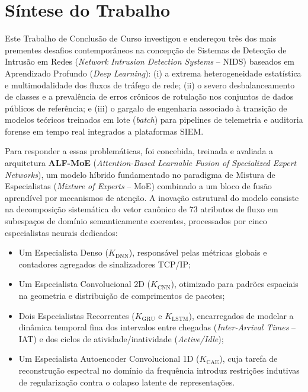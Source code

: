 \section{Síntese do Trabalho}
\label{sec:sintese_trabalho}

Este Trabalho de Conclusão de Curso investigou e endereçou três dos mais prementes desafios contemporâneos na concepção de Sistemas de Detecção de Intrusão em Redes (\emph{Network Intrusion Detection Systems} -- NIDS) baseados em Aprendizado Profundo (\emph{Deep Learning}): (i) a extrema heterogeneidade estatística e multimodalidade dos fluxos de tráfego de rede; (ii) o severo desbalanceamento de classes e a prevalência de erros crônicos de rotulação nos conjuntos de dados públicos de referência; e (iii) o gargalo de engenharia associado à transição de modelos teóricos treinados em lote (\emph{batch}) para pipelines de telemetria e auditoria forense em tempo real integrados a plataformas SIEM.

Para responder a essas problemáticas, foi concebida, treinada e avaliada a arquitetura \textbf{ALF-MoE} (\emph{Attention-Based Learnable Fusion of Specialized Expert Networks}), um modelo híbrido fundamentado no paradigma de Mistura de Especialistas (\emph{Mixture of Experts} -- MoE) combinado a um bloco de fusão aprendível por mecanismos de atenção. A inovação estrutural do modelo consiste na decomposição sistemática do vetor canônico de 73 atributos de fluxo em subespaços de domínio semanticamente coerentes, processados por cinco especialistas neurais dedicados:
\begin{itemize}
    \item Um Especialista Denso ($K_{\mathrm{DNN}}$), responsável pelas métricas globais e contadores agregados de sinalizadores TCP/IP;
    \item Um Especialista Convolucional 2D ($K_{\mathrm{CNN}}$), otimizado para padrões espaciais na geometria e distribuição de comprimentos de pacotes;
    \item Dois Especialistas Recorrentes ($K_{\mathrm{GRU}}$ e $K_{\mathrm{LSTM}}$), encarregados de modelar a dinâmica temporal fina dos intervalos entre chegadas (\emph{Inter-Arrival Times} -- IAT) e dos ciclos de atividade/inatividade (\emph{Active/Idle});
    \item Um Especialista Autoencoder Convolucional 1D ($K_{\mathrm{CAE}}$), cuja tarefa de reconstrução espectral no domínio da frequência introduz restrições indutivas de regularização contra o colapso latente de representações.
\end{itemize}

